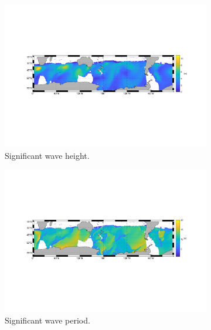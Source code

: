 \begin{figure}[H]
    \centering
    \begin{subfigure}{0.48\linewidth}
        \centering
        \includegraphics[width=\linewidth]{Figures/PipelineValidation/noaamillersignificantWaveHeight.pdf}
        \caption{Significant wave height.}
        \label{fig:pipelineVal.waveDataPlot.height}
    \end{subfigure}   
    \begin{subfigure}{0.48\linewidth}
        \centering
        \includegraphics[width=\linewidth]{Figures/PipelineValidation/noaamillersignificantWavePeriod.pdf}
        \caption{Significant wave period.}
        \label{fig:pipelineVal.waveDataPlot.period}
    \end{subfigure}   
    \begin{subfigure}{0.48\linewidth}

\end{subfigure}
\end{figure}
